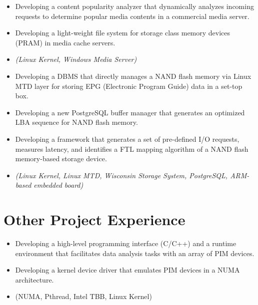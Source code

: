 \begin{itemize}
 \item {Developing a content popularity analyzer that dynamically analyzes incoming requests to determine
 popular media contents in a commercial media server.}
 \item{Developing a light-weight file system for storage class memory devices (PRAM) in media cache servers.}
 \item{\it\small(Linux Kernel, Windows Media Server)}
\end{itemize}

\begin{itemize}
\item{Developing a DBMS that directly manages a NAND flash
         memory via Linux MTD layer for storing EPG (Electronic Program Guide) data in a set-top box.}
\item{Developing a new PostgreSQL buffer manager
         that generates an optimized LBA sequence for NAND flash memory.}
\item{Developing a framework that generates a set of pre-defined I/O
	 requests, measures latency, and identifies a FTL mapping algorithm of a NAND flash memory-based storage device.}

\item{\it\small(Linux Kernel, Linux MTD, Wisconsin Storage System, PostgreSQL,
             ARM-based embedded board)}
\end{itemize}

\section{Other Project Experience}

\begin{itemize}
    \item {Developing a high-level programming interface (C/C++) and a runtime environment that
             facilitates data analysis tasks with an array of PIM devices.}
    \item {Developing a kernel device driver that emulates PIM devices in a NUMA architecture.}
    \item {\small(NUMA, Pthread, Intel TBB, Linux Kernel)}
\end{itemize}

